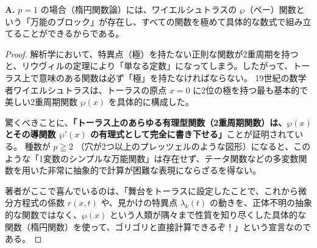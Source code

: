 \begin{Q}[【大局観】著者は「種数 $p \geqq 2$ の場合と異なり、$p=1$（トーラス）のときはすべての量を具体的に書き下すことができる」と強調しているが、なぜ $p=1$ はそんなに特別なのか？]
\textbf{A.} $p=1$ の場合（楕円関数論）には、ワイエルシュトラスの $\wp$（ペー）関数という「万能のブロック」が存在し、すべての関数を極めて具体的な数式で組み立てることができるからである。

\begin{proof}
解析学において、特異点（極）を持たない正則な関数が2重周期を持つと、リウヴィルの定理により「単なる定数」になってしまう。したがって、トーラス上で意味のある関数は必ず「極」を持たなければならない。
19世紀の数学者ワイエルシュトラスは、トーラスの原点 $x=0$ に2位の極を持つ最も基本的で美しい2重周期関数 $\wp(x)$ を具体的に構成した。

驚くべきことに、\textbf{「トーラス上のあらゆる有理型関数（2重周期関数）は、$\wp(x)$ とその導関数 $\wp'(x)$ の有理式として完全に書き下せる」}ことが証明されている。
種数が $p \geqq 2$ （穴が2つ以上のプレッツェルのような図形）になると、このような「1変数のシンプルな万能関数」は存在せず、テータ関数などの多変数関数を用いた非常に抽象的で計算が困難な表現にならざるを得ない。

著者がここで喜んでいるのは、「舞台をトーラスに設定したことで、これから微分方程式の係数 $r(x,t)$ や、見かけの特異点 $\lambda_k(t)$ の動きを、正体不明の抽象的な関数ではなく、$\wp(x)$ という人類が隅々まで性質を知り尽くした具体的な関数（楕円関数）を使って、ゴリゴリと直接計算できるぞ！」という宣言なのである。
\end{proof}
\end{Q}
